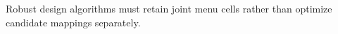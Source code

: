 Robust design algorithms must retain joint menu cells rather than optimize candidate mappings separately.